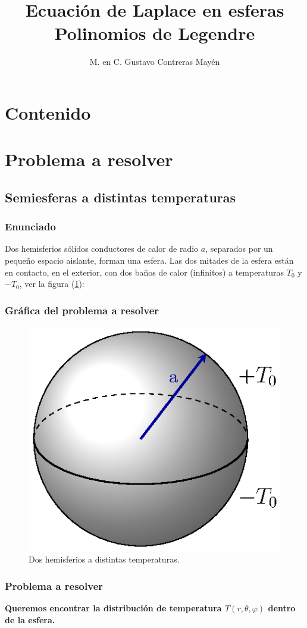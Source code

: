 \documentclass[12pt]{beamer}
\date{}
\title{Ecuación de Laplace en esferas \\ \large{Polinomios de Legendre}}
\author{M. en C. Gustavo Contreras Mayén}
\begin{document}
\maketitle
\fontsize{14}{14}\selectfont
{}


\section*{Contenido}

\section{Problema a resolver}
\subsection{Semiesferas a distintas temperaturas}

\begin{frame}
\frametitle{Enunciado}
Dos hemisferios sólidos conductores de calor de radio $a$, separados por un pequeño espacio aislante, forman una esfera. Las dos mitades de la esfera están en contacto, en el exterior, con dos baños de calor (infinitos) a temperaturas $T_{0}$ y $-T_{0} $, ver la figura (\ref{fig:figura_esfera_01}):
\end{frame}
\begin{frame}\label{figura_esferas}
\frametitle{Gráfica del problema a resolver}
\begin{figure}[H]
    \centering
    \includegraphics[scale=0.95]{Imagenes/Ejemplo_Esfera_01.eps}
    \caption{Dos hemisferios a distintas temperaturas.}
    \label{fig:figura_esfera_01}
\end{figure}
\hyperlink{llama_figura_esferas}{}
\end{frame}
\begin{frame}
\frametitle{Problema a resolver}
\textbf{Queremos encontrar la distribución de temperatura $T(r, \theta, \varphi)$ dentro de la esfera.}
\end{frame}
\end{document}
